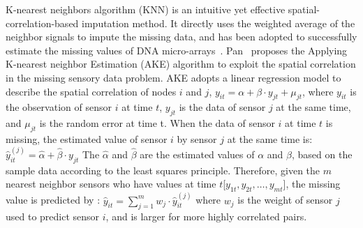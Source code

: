 K-nearest neighbors algorithm (KNN) is an intuitive yet effective spatial-correlation-based imputation method. 
It directly uses the weighted average of the neighbor signals to impute the missing data, and has been adopted to successfully 
estimate the missing values of DNA micro-arrays~\cite{Troyanskaya:DNAKNN}.  
Pan~\cite{pan2010k} proposes the Applying K-nearest neighbor Estimation (AKE) algorithm to exploit the spatial correlation in the 
missing sensory data problem. 
AKE adopts a linear regression model to describe the spatial correlation of nodes $i$ and $j$,
$y_{it} = \alpha + \beta\cdot y_{jt} + \mu_{jt} $,
where $y_{it}$ is the observation of sensor $i$ at time $t$, $y_{jt}$ is the data of sensor $j$ at the same time, 
and $\mu_{jt}$ is the random error at time t.   
When the data of sensor $i$ at time $t$ is missing, the estimated value of sensor $i$ by sensor $j$ at the same time is:
$\hat{y}_{it}^{(j)} =\hat{\alpha} +\hat{\beta}\cdot y_{jt}$
The $\hat{\alpha}$ and $\hat{\beta}$ are the estimated values of $\alpha$ and $\beta$, based on the sample data according to the least squares principle.
Therefore, given the $m$ nearest neighbor sensors who have values at time $t$[$y_{1t}, y_{2t},\dots, y_{mt}$], the missing value is predicted by :   
$ \hat{y}_{it} =\sum_{j=1}^m w_j \cdot \hat{y}_{it}^{(j)}$
%
where $w_j$ is the weight of sensor $j$ used to predict sensor $i$, and is larger for more highly correlated pairs.

